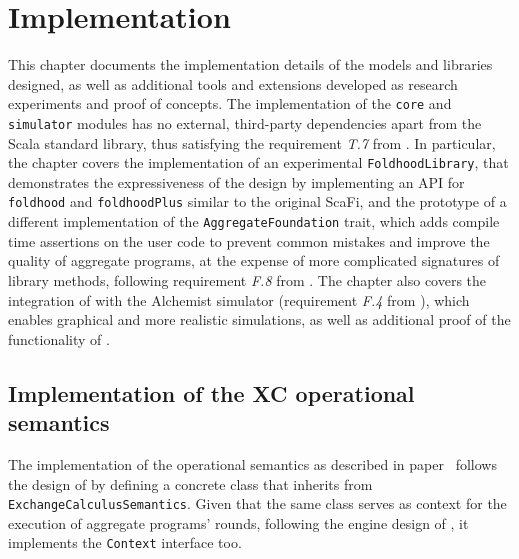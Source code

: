 \chapter{Implementation}
\label{chap:implementation}

This chapter documents the implementation details of the models and libraries designed, as well as additional tools and extensions developed as research experiments and proof of concepts.
%
The implementation of the \texttt{core} and \texttt{simulator} modules has no external, third-party dependencies apart from the Scala standard library, thus satisfying the requirement \textit{T.7} from .
%
In particular, the chapter covers the implementation of an experimental \texttt{FoldhoodLibrary}, that demonstrates the expressiveness of the \this design by implementing an \ac{API} for \texttt{foldhood} and \texttt{foldhoodPlus} similar to the original ScaFi, and the prototype of a different implementation of the \texttt{AggregateFoundation} trait, which adds compile time assertions on the user code to prevent common mistakes and improve the quality of aggregate programs, at the expense of more complicated signatures of library methods, following requirement \textit{F.8} from .
%
The chapter also covers the integration of \this with the Alchemist simulator (requirement \textit{F.4} from ), which enables graphical and more realistic simulations, as well as additional proof of the functionality of \this.

\section{Implementation of the XC operational semantics} \label{chap:implementation->sec:xc-ops}

The implementation of the operational semantics as described in paper~\cite{xc} follows the design of  by defining a concrete class that inherits from \texttt{ExchangeCalculusSemantics}.
%
Given that the same class serves as context for the execution of aggregate programs' rounds, following the engine design of , it implements the \texttt{Context} interface too.

